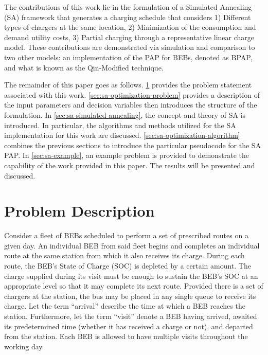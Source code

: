 \documentclass[energies,article,submit,moreauthors]{Definitions/mdpi}
\begin{document}
The contributions of this work lie in the formulation of a Simulated Annealing (SA) framework that generates a charging
schedule that considers 1) Different types of chargers at the same location, 2) Minimization of the consumption and
demand utility costs, 3) Partial charging through a representative linear charge model. These contributions are
demonstrated via simulation and comparison to two other models: an implementation of the PAP for BEBs, denoted as BPAP,
and what is known as the Qin-Modified technique.

The remainder of this paper goes as follows. \ref{sec:sa-problem-description} provides the problem statement associated with
this work. \ref{sec:sa-optimization-problem} provides a description of the input parameters and decision variables then
introduces the structure of the formulation. In \ref{sec:sa-simulated-annealing}, the concept and theory of SA is introduced.
In particular, the algorithms and methods utilized for the SA implementation for this work are discussed.
\ref{sec:sa-optimization-algorithm} combines the previous sections to introduce the particular pseudocode for the SA PAP. In
\ref{sec:sa-example}, an example problem is provided to demonstrate the capability of the work provided in this paper. The
results will be presented and discussed.
\section{Problem Description}
\label{sec:sa-problem-description}
Consider a fleet of BEBs scheduled to perform a set of prescribed routes on a given day. An individual BEB from said
fleet begins and completes an individual route at the same station from which it also receives its charge. During each
route, the BEB's State of Charge (SOC) is depleted by a certain amount. The charge supplied during its visit must be
enough to sustain the BEB's SOC at an appropriate level so that it may complete its next route. Provided there is a set
of chargers at the station, the bus may be placed in any single queue to receive its charge. Let the term ``arrival''
describe the time at which a BEB reaches the station. Furthermore, let the term ``visit'' denote a BEB having arrived,
awaited its predetermined time (whether it has received a charge or not), and departed from the station. Each BEB is
allowed to have multiple visits throughout the working day.
\end{document}
